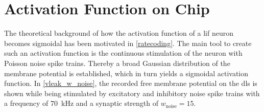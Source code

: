 \section{Activation Function on Chip}
The theoretical background of how the activation function of a \gls{lif} neuron becomes sigmoidal has been motivated in \cref{ratecoding}. The main tool to create such an activation function is the continuous stimulation of the neuron with Poisson noise spike trains. Thereby a broad Gaussian distribution of the membrane potential is established, which in turn yields a sigmoidal activation function. In \cref{vleak_w_noise}, the recorded free membrane potential on the \gls{dls} is shown while being stimulated by excitatory and inhibitory noise spike trains with a frequency of \SI{70}{\kilo \Hz} and a synaptic strength of $w_\text{noise}= 15$. 

